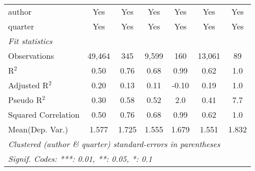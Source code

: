 \begin{tabular}{lcccccc}
   author                                                     & Yes            & Yes           & Yes            & Yes           & Yes           & Yes\\  
   quarter                                                    & Yes            & Yes           & Yes            & Yes           & Yes           & Yes\\  
   \midrule
   \emph{Fit statistics}\\
   Observations                                               & 49,464         & 345           & 9,599          & 160           & 13,061        & 89\\  
   R$^2$                                                      & 0.50           & 0.76          & 0.68           & 0.99          & 0.62          & 1.0\\  
   Adjusted R$^2$                                             & 0.20           & 0.13          & 0.11           & -0.10         & 0.19          & 1.0\\  
   Pseudo R$^2$                                               & 0.30           & 0.58          & 0.52           & 2.0           & 0.41          & 7.7\\  
   Squared Correlation                                        & 0.50           & 0.76          & 0.68           & 0.99          & 0.62          & 1.0\\  
Mean(Dep. Var.) & 1.577 & 1.725 & 1.555 & 1.679 & 1.551 & 1.832 \\
   \midrule \midrule
   \multicolumn{7}{l}{\emph{Clustered (author \& quarter) standard-errors in parentheses}}\\
   \multicolumn{7}{l}{\emph{Signif. Codes: ***: 0.01, **: 0.05, *: 0.1}}\\
\end{tabular}
\par\endgroup
